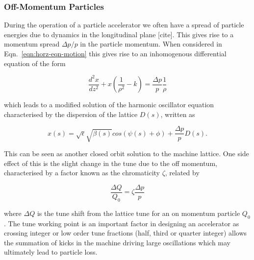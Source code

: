\subsubsection{Off-Momentum Particles}

During the operation of a particle accelerator we often have a spread of particle energies due to dynamics in the longitudinal plane [cite]. This gives rise to a momentum spread $\Delta p/p$ in the particle momentum. When considered in Eqn.~\ref{eqn:horz-eqn-motion} this gives rise to an inhomogenous differential equation of the form

\begin{equation}
\frac{d^{2}x}{dz^{2}} + x \left( \frac{1}{\rho^{2}} - k\right)  = \frac{\Delta p}{p}\frac{1}{\rho}
\label{eqn:disp-eqn-motion}
\end{equation}

which leads to a modified solution of the harmonic oscillator equation characterised by the dispersion of the lattice $D(s)$, written as

\begin{equation}
x \left( s \right) = \sqrt{\epsilon} \sqrt{\beta \left( s \right) } cos \left( \psi \left( s \right) + \phi \right) + \frac{\Delta p}{p} D \left( s \right).
\end{equation}

This can be seen as another closed orbit solution to the machine lattice. One side effect of this is the slight change in the tune due to the off momentum, characterised by a factor known as the chromaticity $\zeta$, related by

\begin{equation}
\frac{\Delta Q}{Q_{0}} = \zeta \frac{\Delta p}{p}
\end{equation}

where $\Delta Q$ is the tune shift from the lattice tune for an on momentum particle $Q_{0}$. The tune working point is an important factor in designing an accelerator as crossing integer or low order tune fractions (half, third or quarter integer) allows the summation of kicks in the machine driving large oscillations which may ultimately lead to particle loss. 
